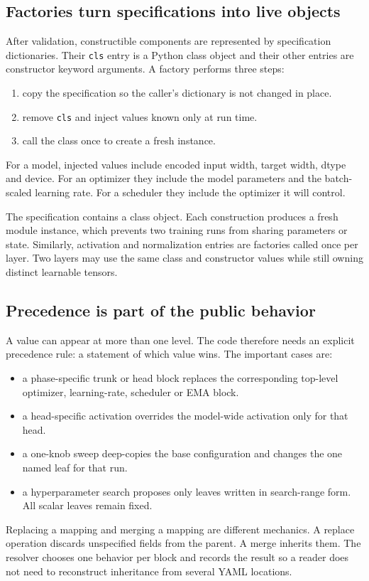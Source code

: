 \documentclass[10pt,aps,prd,twocolumn,nofootinbib]{revtex4-2}
\newcommand{\code}[1]{\texttt{#1}}
\begin{document}
\subsection{Factories turn specifications into live objects}

After validation, constructible components are represented by specification
dictionaries.  Their \code{cls} entry is a Python class object and their other
entries are constructor keyword arguments.  A factory performs three steps:
\begin{enumerate}
  \item copy the specification so the caller's dictionary is not changed in
        place.
  \item remove \code{cls} and inject values known only at run time.
  \item call the class once to create a fresh instance.
\end{enumerate}
For a model, injected values include encoded input width, target width, dtype
and device.  For an optimizer they include the model parameters and the
batch-scaled learning rate.  For a scheduler they include the optimizer it
will control.

The specification contains a class object.  Each construction produces a fresh
module instance, which prevents two training runs from sharing parameters or state.
Similarly, activation and normalization entries are factories called once per
layer.  Two layers may use the same class and constructor values while still
owning distinct learnable tensors.

\subsection{Precedence is part of the public behavior}

A value can appear at more than one level.  The code therefore needs an
explicit precedence rule: a statement of which value wins.  The important
cases are:
\begin{itemize}
  \item a phase-specific trunk or head block replaces the corresponding
        top-level optimizer, learning-rate, scheduler or EMA block.
  \item a head-specific activation overrides the model-wide activation only
        for that head.
  \item a one-knob sweep deep-copies the base configuration and changes the
        one named leaf for that run.
  \item a hyperparameter search proposes only leaves written in search-range
        form.  All scalar leaves remain fixed.
\end{itemize}
Replacing a mapping and merging a mapping are different mechanics.  A replace
operation discards unspecified fields from the parent.  A merge inherits
them.  The resolver chooses one behavior per block and records the result so a
reader does not need to reconstruct inheritance from several YAML locations.
\end{document}
